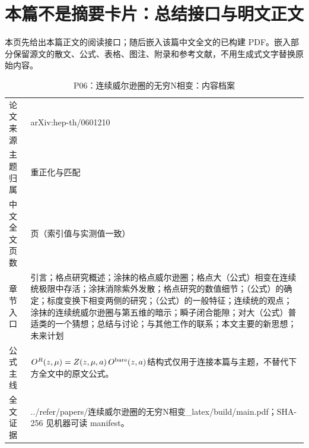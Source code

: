 \documentclass[UTF8,11pt,oneside]{ctexbook}
\begin{document}
\section*{本篇不是摘要卡片：总结接口与明文正文}
本页先给出本篇正文的阅读接口；随后嵌入该篇中文全文的已构建 PDF。嵌入部分保留源文的散文、公式、表格、图注、附录和参考文献，不用生成式文字替换原始内容。
\begin{table}[htbp]
  \centering
  \caption{P06：连续威尔逊圈的无穷N相变：内容档案}
  \small
  \begin{tabularx}{0.96\textwidth}{@{}p{3.3cm}>{\raggedright\arraybackslash}X@{}}
    \toprule
    论文来源 & arXiv:hep-th/0601210 \\
    主题归属 & 重正化与匹配 \\
    中文全文页数 & 25 页（索引值与实测值一致） \\
    章节入口 & 引言；格点研究概述；涂抹的格点威尔逊圈；格点大（公式）相变在连续统极限中存活；涂抹消除紫外发散；格点研究的数值细节；（公式）的确定；标度变换下相变两侧的研究；（公式）的一般特征；连续统的观点；涂抹的连续统威尔逊圈与第五维的暗示；瞬子闭合能隙；对大（公式）普适类的一个猜想；总结与讨论；与其他工作的联系；本文主要的新思想；未来计划 \\
    公式主线 & $O^{R}(z,\mu)=Z(z,\mu,a)\,O^{\rm bare}(z,a)$\newline\scriptsize 结构式仅用于连接本篇与主题，不替代下方全文中的原文公式。 \\
    全文证据 & ../\allowbreak{}refer/\allowbreak{}papers/\allowbreak{}连续威尔逊圈的无穷N相变\_\allowbreak{}latex/\allowbreak{}build/\allowbreak{}main.pdf；SHA-256 见机器可读 manifest。 \\
    \bottomrule
  \end{tabularx}
\end{table}
\end{document}
